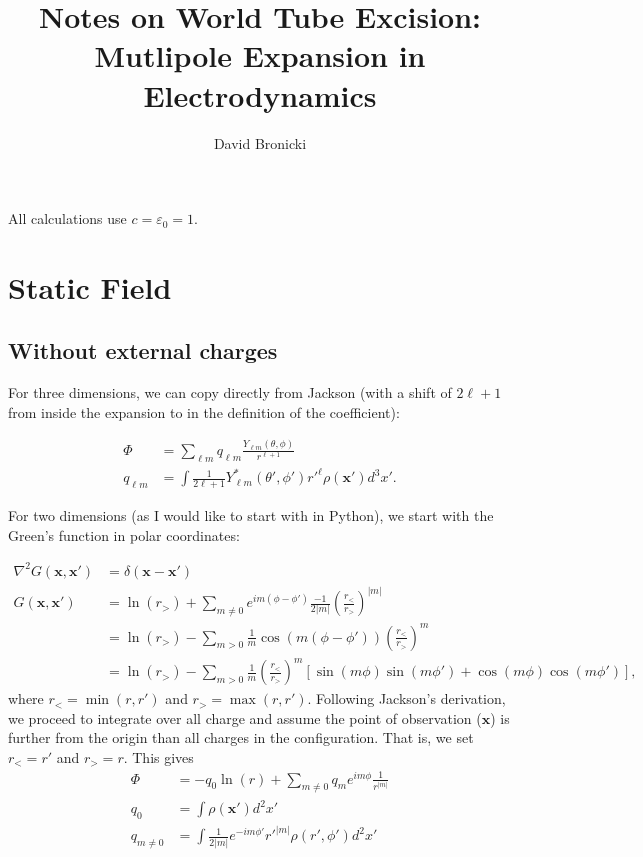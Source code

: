 \documentclass[12pt]{article}
\renewcommand{\bf}[1]{\boldsymbol{#1}}
\begin{document}
\title{Notes on World Tube Excision: Mutlipole Expansion in Electrodynamics}
\author{David Bronicki}

\maketitle

All calculations use $c=\varepsilon_0=1$.

\section{Static Field}

\subsection{Without external charges}

For three dimensions, we can copy directly from Jackson
(with a shift of $2\ell+1$ from inside the expansion
to in the definition of the coefficient):

\begin{align}
	\Phi&=\sum_{\ell m}q_{\ell m}
	\frac{Y_{\ell m}(\theta, \phi)}{r^{\ell+1}}\\
	q_{\ell m}&=
	\int \frac{1}{2\ell+1} Y_{\ell m}^*(\theta',\phi'){r'}^\ell\rho(\bf x')d^3x'.
\end{align}

For two dimensions (as I would like to start with in Python),
we start with the Green's function in polar coordinates:

\begin{align}
	\nabla^2 G(\bf x, \bf x')&=\delta(\bf x - \bf x')\\
	G(\bf x, \bf x')&=\ln(r_>)+
	\sum_{m\neq 0}e^{im(\phi-\phi')}
	\frac{-1}{2|m|}\left(\frac{r_<}{r_>}\right)^{|m|}\\
	&=\ln(r_>)-
	\sum_{m>0}\frac{1}{m}\cos(m(\phi-\phi'))
	\left(\frac{r_<}{r_>}\right)^m\\
	&=\ln(r_>)-
	\sum_{m>0}\frac{1}{m}\left(\frac{r_<}{r_>}\right)^m
	\left[\sin(m\phi)\sin(m\phi')+\cos(m\phi)\cos(m\phi')\right],
\end{align}
where $r_<=\min(r,r')$ and $r_>=\max(r,r')$.
Following Jackson's derivation, we proceed to
integrate over all charge and assume the point
of observation ($\bf x$) is further from the
origin than all charges in the configuration.
That is, we set $r_<=r'$ and $r_>=r$. This gives
\begin{align}
	\Phi&=-q_0 \ln(r)+\sum_{m\neq 0}q_m e^{im\phi}\frac{1}{r^{|m|}}\\
	q_0&=\int\rho(\bf x') d^2x'\\
	q_{m\neq 0}&=\int \frac{1}{2|m|}e^{-im\phi'}{r'}^{|m|}\rho(r',\phi')d^2x'
\end{align}
\end{document}
